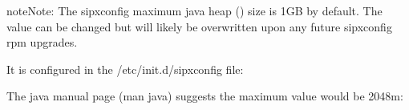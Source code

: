 \documentclass[letterpaper,10pt,english]{sphinxmanual}
\begin{document}
\begin{sphinxadmonition}{note}{Note:}
The sipxconfig maximum java heap () size is 1GB by default.
The value can be changed but will likely be overwritten upon any future sipxconfig rpm upgrades.

It is configured in the /etc/init.d/sipxconfig file:

\begin{sphinxVerbatim}[commandchars=\\\{\}]
\end{sphinxVerbatim}

The java manual page (man java) suggests the maximum value would be 2048m:


\end{sphinxadmonition}
\end{document}
